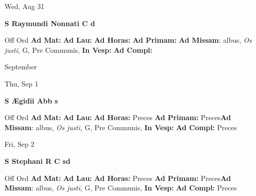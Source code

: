 \documentclass[10pt]{memoir}
\begin{document}
\begin{center}
\begin{minipage}{3.5in}
\vspace{2em}
\begin{center}Wed, Aug 31
\end{center}
\textbf{ \large S Raymundi Nonnati C
\textnormal{\normalsize d}}

\begin{justify}Off Ord
\textbf{Ad Mat: }
\textbf{Ad Lau: }
\textbf{Ad Horas: }
\textbf{Ad Primam: }\textbf{Ad Missam}: albus, \textit{Os justi,} G, Pre Communis, 
\textbf{In Vesp: }
\textbf{Ad Compl: }
\end{justify}
\end{minipage}
\end{center}

\begin{center}
\pagebreak
\thispagestyle{empty}
{\Huge September}
\end{center}
                    
\begin{center}
\begin{minipage}{3.5in}
\vspace{2em}
\begin{center}Thu, Sep 1
\end{center}
\textbf{ \large S Ægidii Abb
\textnormal{\normalsize s}}

\begin{justify}Off Ord
\textbf{Ad Mat: }
\textbf{Ad Lau: }
\textbf{Ad Horas: }Preces
\textbf{Ad Primam: }Preces\textbf{Ad Missam}: albus, \textit{Os justi,} G, Pre Communis, 
\textbf{In Vesp: }
\textbf{Ad Compl: }Preces
\end{justify}
\end{minipage}
\end{center}

\begin{center}
\begin{minipage}{3.5in}
\vspace{2em}
\begin{center}Fri, Sep 2
\end{center}
\textbf{ \large S Stephani R C
\textnormal{\normalsize sd}}

\begin{justify}Off Ord
\textbf{Ad Mat: }
\textbf{Ad Lau: }
\textbf{Ad Horas: }Preces
\textbf{Ad Primam: }Preces\textbf{Ad Missam}: albus, \textit{Os justi,} G, Pre Communis, 
\textbf{In Vesp: }
\textbf{Ad Compl: }Preces
\end{justify}
\end{minipage}
\end{center}
\end{document}
